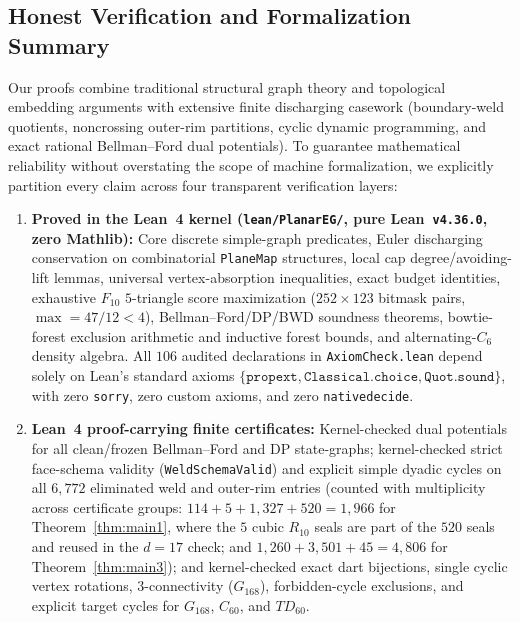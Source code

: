 \documentclass[11pt,reqno]{amsart}
\theoremstyle{plain}
\theoremstyle{definition}
\theoremstyle{remark}
\DeclareRobustCommand{\_}{\ifmmode\text{\textunderscore}\else\textunderscore\allowbreak\fi}
\begin{document}
\subsection{Honest Verification and Formalization Summary}\label{subsec:honest-scope}

Our proofs combine traditional structural graph theory and topological embedding arguments with extensive finite discharging casework (boundary-weld quotients, noncrossing outer-rim partitions, cyclic dynamic programming, and exact rational Bellman--Ford dual potentials). To guarantee mathematical reliability without overstating the scope of machine formalization, we explicitly partition every claim across four transparent verification layers:
\begin{enumerate}[label=(\roman*),leftmargin=2.2em]
  \item \textbf{Proved in the Lean~4 kernel (\texttt{lean/PlanarEG/}, pure Lean~\texttt{v4.36.0}, zero Mathlib):} Core discrete simple-graph predicates, Euler discharging conservation on combinatorial \texttt{PlaneMap} structures, local cap degree/avoiding-lift lemmas, universal vertex-absorption inequalities, exact budget identities, exhaustive $F_{10}$ $5$-triangle score maximization ($252 \times 123$ bitmask pairs, $\max = 47/12 < 4$), Bellman--Ford/DP/BWD soundness theorems, bowtie-forest exclusion arithmetic and inductive forest bounds, and alternating-$C_6$ density algebra. All $106$ audited declarations in \texttt{AxiomCheck.lean} depend solely on Lean's standard axioms $\{\texttt{propext}, \texttt{Classical.choice}, \texttt{Quot.sound}\}$, with zero \texttt{sorry}, zero custom axioms, and zero \texttt{native\_decide}.
  \item \textbf{Lean~4 proof-carrying finite certificates:} Kernel-checked dual potentials for all clean/frozen Bellman--Ford and DP state-graphs; kernel-checked strict face-schema validity (\texttt{WeldSchemaValid}) and explicit simple dyadic cycles on all $6{,}772$ eliminated weld and outer-rim entries (counted with multiplicity across certificate groups: $114 + 5 + 1{,}327 + 520 = 1{,}966$ for Theorem~\ref{thm:main1}, where the $5$ cubic $R_{10}$ seals are part of the $520$ seals and reused in the $d=17$ check; and $1{,}260 + 3{,}501 + 45 = 4{,}806$ for Theorem~\ref{thm:main3}); and kernel-checked exact dart bijections, single cyclic vertex rotations, $3$-connectivity ($G_{168}$), forbidden-cycle exclusions, and explicit target cycles for $G_{168}$, $C_{60}$, and $TD_{60}$.

\end{enumerate}
\end{document}
